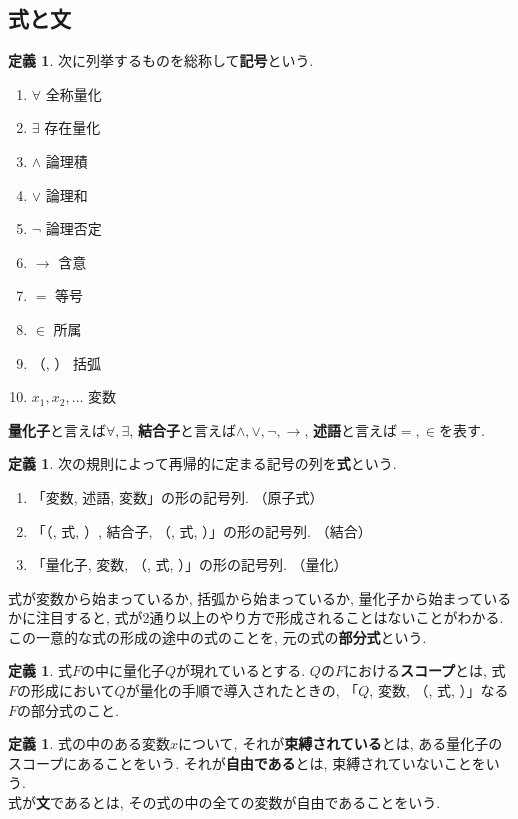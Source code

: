 \documentclass[a4paper]{bxjsarticle}
\theoremstyle{definition}
\newtheorem{defn}[thm]{定義}
\begin{document}
    \subsection{式と文}
    \begin{defn}
        次に列挙するものを総称して\textbf{記号}という.
        \begin{enumerate}
            \item $\forall$ 全称量化
            \item $\exists$ 存在量化
            \item $\land$ 論理積
            \item $\lor$ 論理和
            \item $\lnot$ 論理否定
            \item $\to$ 含意
            \item $=$ 等号
            \item $\in$ 所属
            \item （, ） 括弧
            \item $x_1, x_2, \dots$ 変数
        \end{enumerate}
        \textbf{量化子}と言えば$\forall, \exists$, \textbf{結合子}と言えば$\land, \lor, \lnot, \to$, \textbf{述語}と言えば$=, \in$を表す.
    \end{defn}
    \begin{defn}    
        次の規則によって再帰的に定まる記号の列を\textbf{式}という.
        \begin{enumerate}
            \item 「変数, 述語, 変数」の形の記号列. （原子式）
            \item 「（, 式, ）, 結合子, （, 式, ）」の形の記号列. （結合）
            \item 「量化子, 変数, （, 式, ）」の形の記号列. （量化）
        \end{enumerate}
        式が変数から始まっているか, 括弧から始まっているか, 量化子から始まっているかに注目すると, 式が2通り以上のやり方で形成されることはないことがわかる. この一意的な式の形成の途中の式のことを, 元の式の\textbf{部分式}という.
    \end{defn}
    \begin{defn}
        式$F$の中に量化子$Q$が現れているとする. $Q$の$F$における\textbf{スコープ}とは, 式$F$の形成において$Q$が量化の手順で導入されたときの, 「$Q$, 変数, （, 式, ）」なる$F$の部分式のこと.
    \end{defn}
    \begin{defn}
        式の中のある変数$x$について, それが\textbf{束縛されている}とは, ある量化子のスコープにあることをいう. それが\textbf{自由である}とは, 束縛されていないことをいう.\\
        式が\textbf{文}であるとは, その式の中の全ての変数が自由であることをいう.
    \end{defn}
    
\end{document}
